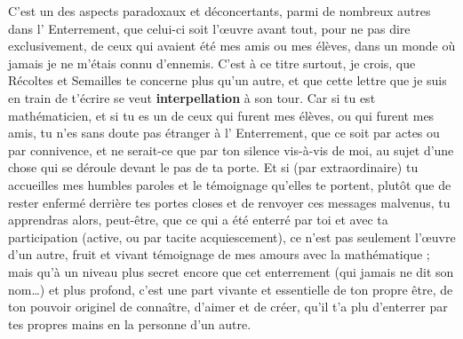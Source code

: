 C'est un des aspects paradoxaux et déconcertants, parmi de nombreux autres dans l' Enterrement, que celui-ci soit l'œuvre avant tout, pour ne pas dire exclusivement, de ceux qui avaient été mes amis ou mes élèves, dans un monde où jamais je ne m'étais connu d'ennemis. C'est à ce titre surtout, je crois, que Récoltes et Semailles te concerne plus qu'un autre, et que cette lettre que je suis en train de t'écrire se veut \textbf{interpellation} à son tour. Car si tu est mathématicien, et si tu es un de ceux qui furent mes élèves, ou qui furent mes amis, tu n'es sans doute pas étranger à l' Enterrement, que ce soit par actes ou par connivence, et ne serait-ce que par ton silence vis-à-vis de moi, au sujet d'une chose qui se déroule devant le pas de ta porte. Et si (par extraordinaire) tu accueilles mes humbles paroles et le témoignage qu'elles te portent, plutôt que de rester enfermé derrière tes portes closes et de renvoyer ces messages malvenus, tu apprendras alors, peut-être, que ce qui a été enterré par toi et avec ta participation (active, ou par tacite acquiescement), ce n'est pas seulement l'œuvre d'un autre, fruit et vivant témoignage de mes amours avec la mathématique ; mais qu'à un niveau plus secret encore que cet enterrement (qui jamais ne dit son nom\ldots) et plus profond, c'est une part vivante et essentielle de ton propre être, de ton pouvoir originel de connaître, d'aimer et de créer, qu'il t'a plu d'enterrer par tes propres mains en la personne d'un autre.

